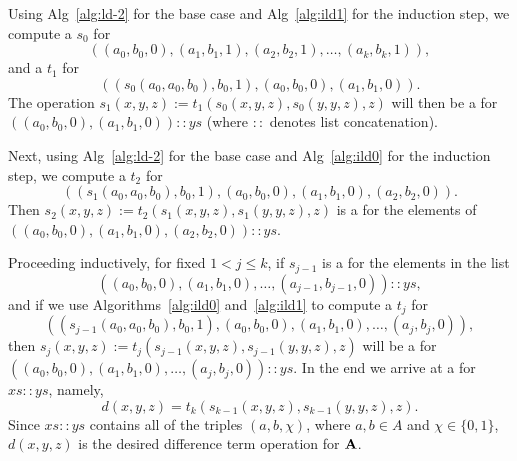 Using Alg~\ref{alg:ld-2} for the base case
and Alg~\ref{alg:ild1}
for the induction step,
we compute a \ldto $s_0$ for
\begin{equation*}
((a_0, b_0, 0), (a_1, b_1, 1), (a_2, b_2, 1), \dots, (a_k, b_k, 1)),
\end{equation*}
and a \ldto $t_1$ for
\begin{equation*}
((s_0(a_0, a_0, b_0), b_0, 1), (a_0, b_0, 0),(a_1, b_1, 0)).
\end{equation*}
The operation $s_1(x,y,z) := t_1(s_0(x,y,z), s_0(y,y,z), z)$ will then be
a \ldto for
$((a_0, b_0, 0), (a_1, b_1, 0)) :: ys$  (where $::$ denotes
list concatenation).

Next, using Alg~\ref{alg:ld-2} for the base case
and Alg~\ref{alg:ild0} for the induction step,
we compute a \ldto $t_2$ for
\begin{equation*}
((s_1(a_0, a_0, b_0), b_0, 1), (a_0, b_0, 0),(a_1, b_1, 0),(a_2, b_2, 0)).
\end{equation*}
Then $s_2(x,y,z) := t_2(s_1(x,y,z), s_1(y,y,z), z)$ is a \ldto
for the elements of
$((a_0, b_0, 0), (a_1, b_1, 0), (a_2, b_2, 0)) :: ys$.

Proceeding inductively, for fixed $1<j\leq k$,
if $s_{j-1}$ is a \ldto
for the elements in the list
\begin{equation*}
((a_0, b_0, 0), (a_1, b_1, 0), \dots, (a_{j-1}, b_{j-1}, 0)) :: ys,
\end{equation*}
and if we use Algorithms~\ref{alg:ild0} and~\ref{alg:ild1}
to compute a \ldto $t_j$ for
\begin{equation*}
((s_{j-1}(a_0, a_0, b_0), b_0, 1), (a_0, b_0, 0),(a_1, b_1, 0),\dots,
(a_j, b_j, 0)),
\end{equation*}
then $s_j(x,y,z) := t_j(s_{j-1}(x,y,z), s_{j-1}(y,y,z), z)$ will be a
\ldto for
$((a_0, b_0, 0), (a_1, b_1, 0), \dots, (a_j, b_j, 0)) :: ys$.
In the end we arrive at a \ldto for $xs :: ys$, namely,
\begin{equation*}
d(x,y,z) = t_k(s_{k-1}(x,y,z), s_{k-1}(y,y,z), z).
\end{equation*}
Since $xs :: ys$ contains all of the triples $(a,b,\chi)$, where
$a, b \in A$ and $\chi \in \{0,1\}$,
$d(x,y,z)$ is the desired difference term operation for $\mathbf{A}$.







